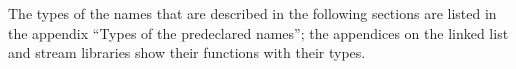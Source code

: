 The types of the names that are described in the following sections are listed in the appendix
``Types of the predeclared names''; the appendices on the linked list and stream libraries show
their functions with their types.

